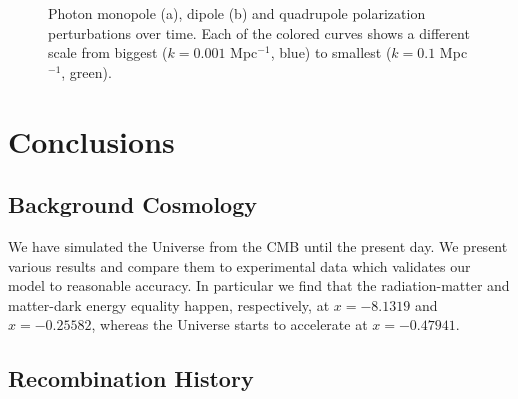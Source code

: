\documentclass{aa}
\begin{document}
\begin{figure}[ht]
    \centering
    \quad
    \quad
    \caption{Photon monopole (a), dipole (b) and quadrupole polarization perturbations over time. Each of the colored curves shows a different scale from biggest ($k = 0.001$ Mpc$^{-1}$, blue) to smallest ($k=0.1$ Mpc$^{-1}$, green).}
    \label{fig:thetap}
\end{figure}

\section{Conclusions}

\subsection{Background Cosmology}
We have simulated the Universe from the CMB until the present day. We present various results and compare them to experimental data which validates our model to reasonable accuracy. In particular we find that the radiation-matter and matter-dark energy equality happen, respectively, at $x = -8.1319$ and $x = -0.25582$, whereas the Universe starts to accelerate at $x=-0.47941$.

\subsection{Recombination History}
\end{document}
